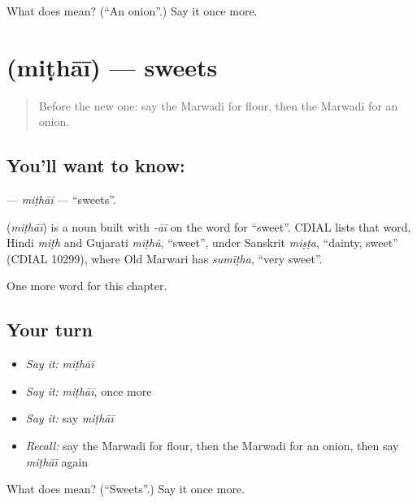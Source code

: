 \begin{tcolorbox}[breakable,colback=teal!4,colframe=teal!35!black,title={Before you move on}]
What does  mean? (\textquotedblleft{}An onion\textquotedblright{}.) Say it once more.
\end{tcolorbox}
\section[\texorpdfstring{\mw{मिठाई} (miṭhāī)}{मिठाई (miṭhāī)}]{ (miṭhāī) — sweets}

\label{lesson:MW-C61-mithai}



\begin{quote}
Before the new one: say the Marwadi for flour, then the Marwadi for an onion.
\end{quote}

\subsection*{You'll want to know: }
\textbf{} — \emph{miṭhāī} — \textquotedblleft{}sweets\textquotedblright{}.

\begin{cousinweb}
\textbf{} (\emph{miṭhāī}) is a noun built with \emph{-āī} on the word for \textquotedblleft{}sweet\textquotedblright{}. CDIAL lists that word, Hindi \emph{miṭh} and Gujarati \emph{mīṭhũ}, \textquotedblleft{}sweet\textquotedblright{}, under Sanskrit \emph{miṣṭa}, \textquotedblleft{}dainty, sweet\textquotedblright{} (CDIAL 10299), where Old Marwari has \emph{sumīṭha}, \textquotedblleft{}very sweet\textquotedblright{}.
\end{cousinweb}

\begin{grammarlens}[title={What you've built}]
One more word for this chapter.
\end{grammarlens}

\subsection*{Your turn}
\begin{itemize}
\raggedright
  \item \emph{Say it:} \emph{miṭhāī}
  \item \emph{Say it:} \emph{miṭhāī}, once more
  \item \emph{Say it:} say \emph{miṭhāī}
  \item \emph{Recall:} say the Marwadi for flour, then the Marwadi for an onion, then say \emph{miṭhāī} again
\end{itemize}

\begin{tcolorbox}[breakable,colback=teal!4,colframe=teal!35!black,title={Before you move on}]
What does  mean? (\textquotedblleft{}Sweets\textquotedblright{}.) Say it once more.
\end{tcolorbox}
